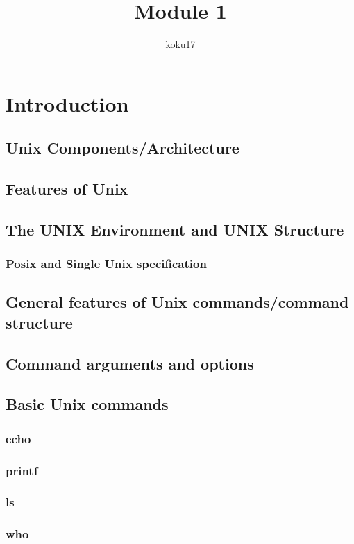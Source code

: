 \documentclass{article}
\author{koku17}
\title{Module 1}
\begin{document}
     \maketitle \newpage
     \tableofcontents \newpage

	\section{Introduction}
	\subsection{Unix Components/Architecture}
	\subsection{Features of Unix}
	\subsection{The UNIX Environment and UNIX Structure}
	\subsubsection{Posix and Single Unix specification}
	\subsection{General features of Unix commands/command structure}
	\subsection{Command arguments and options}
	\subsection{Basic Unix commands}
	\subsubsection{echo}
	\subsubsection{printf}
	\subsubsection{ls}
	\subsubsection{who}
\end{document}
